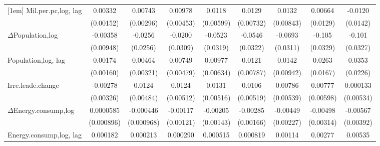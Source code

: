 \begin{table}[htbp]
\begin{tabular}{l*{8}{c}}
[1em]
Mil.per.pc,log, lag     &     0.00332\sym{**} &     0.00743\sym{**} &     0.00978\sym{**} &      0.0118\sym{*}  &      0.0129\sym{*}  &      0.0132         &     0.00664         &     -0.0120         \\
                    &   (0.00152)         &   (0.00296)         &   (0.00453)         &   (0.00599)         &   (0.00732)         &   (0.00843)         &    (0.0129)         &    (0.0142)         \\
[1em]
$\Delta$Population,log             &    -0.00358         &     -0.0256         &     -0.0200         &     -0.0523         &     -0.0546\sym{*}  &     -0.0693\sym{**} &      -0.105\sym{***}&      -0.101\sym{***}\\
                    &   (0.00948)         &    (0.0256)         &    (0.0309)         &    (0.0319)         &    (0.0322)         &    (0.0311)         &    (0.0329)         &    (0.0327)         \\
[1em]
Population,log, lag             &     0.00174         &     0.00464         &     0.00749         &     0.00977         &      0.0121         &      0.0142         &      0.0263         &      0.0353         \\
                    &   (0.00160)         &   (0.00321)         &   (0.00479)         &   (0.00634)         &   (0.00787)         &   (0.00942)         &    (0.0167)         &    (0.0226)         \\
[1em]
Irre.leade.change    &    -0.00278         &      0.0124\sym{**} &      0.0124\sym{**} &      0.0131\sym{**} &      0.0106\sym{**} &     0.00786         &     0.00777         &    0.000133         \\
                    &   (0.00326)         &   (0.00484)         &   (0.00512)         &   (0.00516)         &   (0.00519)         &   (0.00539)         &   (0.00598)         &   (0.00534)         \\
[1em]
$\Delta$Energy.consump,log            &   0.0000585         &   -0.000446         &    -0.00117         &    -0.00205         &    -0.00285\sym{*}  &    -0.00449\sym{**} &    -0.00498         &    -0.00567         \\
                    &  (0.000896)         &  (0.000968)         &   (0.00121)         &   (0.00143)         &   (0.00166)         &   (0.00227)         &   (0.00314)         &   (0.00392)         \\
[1em]
Energy.consump,log, lag           &    0.000182         &    0.000213         &    0.000290         &    0.000515         &    0.000819         &     0.00114         &     0.00277         &     0.00535\sym{*}  \\

\end{tabular}
\end{table}
